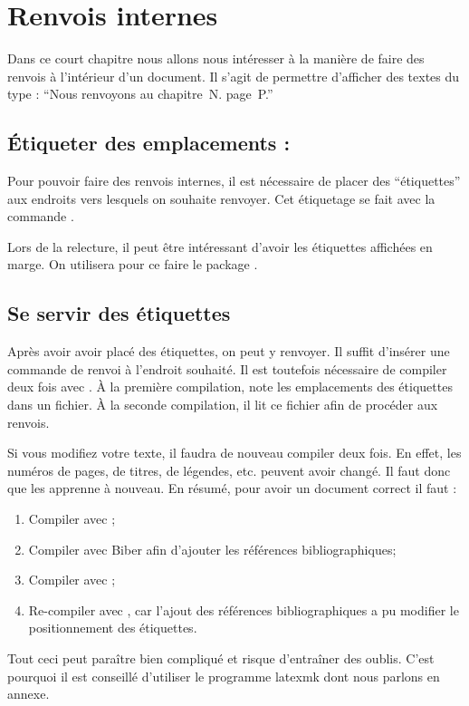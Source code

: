 \chapter{Renvois internes}\label{label}

\begin{intro}
Dans ce court chapitre nous allons nous intéresser à la manière de faire des renvois à l'intérieur d'un document.
Il s'agit de permettre d'afficher des textes du type : \enquote{Nous renvoyons au chapitre~N. page~P.}
\end{intro}

\section{Étiqueter des  emplacements : }

Pour pouvoir faire des renvois internes, il est nécessaire de placer des \enquote{étiquettes} aux endroits vers lesquels on souhaite renvoyer.
Cet étiquetage  se fait avec la commande .

\begin{plusloins}
Lors de la relecture, il peut être intéressant d'avoir les étiquettes affichées en marge. On utilisera pour ce faire le package .
\end{plusloins}

\section{Se servir des étiquettes}

Après avoir avoir placé des étiquettes, on peut y renvoyer. 
Il suffit d'insérer une commande de renvoi à l'endroit souhaité. 
Il est toutefois nécessaire de compiler deux fois avec \XeLaTeX.
À la première compilation,   \XeLaTeX
note les emplacements des étiquettes dans un fichier. À la seconde compilation, il lit ce fichier afin de procéder aux renvois. 

\begin{attention}
    Si vous modifiez votre texte, il faudra de nouveau compiler deux fois. En effet, les numéros de pages, de titres, de légendes, etc. peuvent avoir changé. Il faut donc  que \XeLaTeX{} les apprenne à nouveau. En résumé, pour avoir un document correct il faut :
    \begin{enumerate}
        \item Compiler avec \XeLaTeX{};
        \item Compiler avec  Biber afin d'ajouter les références bibliographiques;
        \item Compiler avec \XeLaTeX{};
        \item Re-compiler avec \XeLaTeX{}, car l'ajout des références bibliographiques a pu modifier le positionnement des étiquettes.
    \end{enumerate}
    
    Tout ceci peut paraître bien compliqué et risque d'entraîner des oublis. C'est pourquoi il est conseillé d'utiliser le programme latexmk dont nous parlons en annexe.
\end{attention}


